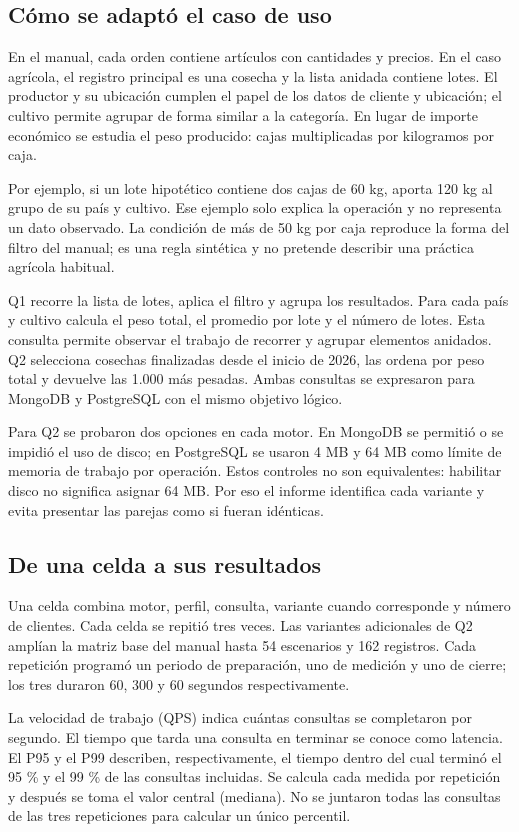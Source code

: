 \documentclass[12pt,letterpaper]{article}
\begin{document}
\subsection*{Cómo se adaptó el caso de uso}
En el manual, cada orden contiene artículos con cantidades y precios. En el caso agrícola, el registro principal es una cosecha y la lista anidada contiene lotes. El productor y su ubicación cumplen el papel de los datos de cliente y ubicación; el cultivo permite agrupar de forma similar a la categoría. En lugar de importe económico se estudia el peso producido: cajas multiplicadas por kilogramos por caja.

Por ejemplo, si un lote hipotético contiene dos cajas de 60 kg, aporta 120 kg al grupo de su país y cultivo. Ese ejemplo solo explica la operación y no representa un dato observado. La condición de más de 50 kg por caja reproduce la forma del filtro del manual; es una regla sintética y no pretende describir una práctica agrícola habitual.

Q1 recorre la lista de lotes, aplica el filtro y agrupa los resultados. Para cada país y cultivo calcula el peso total, el promedio por lote y el número de lotes. Esta consulta permite observar el trabajo de recorrer y agrupar elementos anidados. Q2 selecciona cosechas finalizadas desde el inicio de 2026, las ordena por peso total y devuelve las 1.000 más pesadas. Ambas consultas se expresaron para MongoDB y PostgreSQL con el mismo objetivo lógico.

Para Q2 se probaron dos opciones en cada motor. En MongoDB se permitió o se impidió el uso de disco; en PostgreSQL se usaron 4 MB y 64 MB como límite de memoria de trabajo por operación. Estos controles no son equivalentes: habilitar disco no significa asignar 64 MB. Por eso el informe identifica cada variante y evita presentar las parejas como si fueran idénticas.

\subsection*{De una celda a sus resultados}
Una celda combina motor, perfil, consulta, variante cuando corresponde y número de clientes. Cada celda se repitió tres veces. Las variantes adicionales de Q2 amplían la matriz base del manual hasta 54 escenarios y 162 registros. Cada repetición programó un periodo de preparación, uno de medición y uno de cierre; los tres duraron 60, 300 y 60 segundos respectivamente.

La velocidad de trabajo (QPS) indica cuántas consultas se completaron por segundo. El tiempo que tarda una consulta en terminar se conoce como latencia. El P95 y el P99 describen, respectivamente, el tiempo dentro del cual terminó el 95 \% y el 99 \% de las consultas incluidas. Se calcula cada medida por repetición y después se toma el valor central (mediana). No se juntaron todas las consultas de las tres repeticiones para calcular un único percentil.
\end{document}
